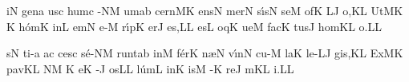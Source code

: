\smallskip


\initiumgregorianum
{}%
i{}\punctum N\egn
\spatium
\sgn g{e}n\punctum a\egn
\sgn {}us\punctum c\egn
\spatium
\sgn hum\punctum c\egn
{}-\clivis NM\egn
{}um\punctum a\augmentum b\egn
\spatium
\divisiominima
\spatium
\sgn c{e}{rn}\clivis MK\egn
\sgn {}e{ns}\punctum N\egn
\spatium
\sgn mer\punctum N\egn
\sgn s{\'\i}s\punctum N\egn
\sgn se{}\punctum M\egn
\spatium
{}of\punctum K\egn
{}\clivis LJ\egn
\sgn {}o,\punctum K\augmentum L\egn
\spatium
\divisiominor
\spatium
\sgn {}Ut\clivis MK\egn
\spatium
\custos K
\lineaproxima
\sgn h{\'o}m\punctum K\egn
\sgn {}in\punctum L\egn
\sgn {}em\punctum N\egn
\spatium
\sgn {}e-\punctum M\egn
\sgn r{\'\i}p\punctum K\egn
\sgn {}er\punctum J\egn
\sgn {}e{s,}\punctum L\augmentum L\egn
\spatium
\divisiominima
\spatium
\sgn {}es\punctum L\egn
\spatium
{}oq\punctum K\egn
\sgn ue{}\punctum M\egn
\spatium
\sgn f{a}c\punctum K\egn
\sgn tus\punctum J\egn
\spatium
\sgn h{o}m\pes KL\egn
\sgn {}o.\punctum L\augmentum L\egn
\Finisgregoriana



\smallskip


\initiumgregorianum
{}%
s\punctum N\egn
\sgn ti-\punctum a\egn
\sgn {}a{}\punctum c\egn
\spatium
\sgn ces\punctum c\egn
\sgn s{\'e}-\clivis NM\egn
\sgn ru{nt}\punctum a\augmentum b\egn
\spatium
\divisiominima
\spatium
\sgn {}in\punctum M\egn
\sgn f{\'e}r\punctum K\egn
\sgn n{\ae}{}\punctum N\egn
\spatium
\sgn v{\'\i}n\punctum N\egn
\sgn cu-\punctum M\egn
\sgn la{}\punctum K\egn
\spatium
\sgn l{e}-\clivis LJ\egn
\sgn gi{s,}\punctum K\augmentum L\egn
\spatium
\divisiominor
\spatium
\sgn {}Ex\clivis MK\egn
\sgn pav\pes KL\egn
{}\clivis NM\egn
\custos K
\lineaproxima
{}e{}\punctum K\egn
\spatium
{}-\punctum J\egn
\sgn {}os\punctum L\augmentum L\egn
\spatium
\divisiominima
\spatium
\sgn l{\'u}m\punctum L\egn
\sgn {}in\punctum K\egn
\sgn {}is\punctum M\egn
\spatium
{}-\punctum K\egn
\sgn re{}\punctum J\egn
\spatium
{}m\pes KL\egn
\sgn {}i.\punctum L\augmentum L\egn
\Finisgregoriana


\smallskip


